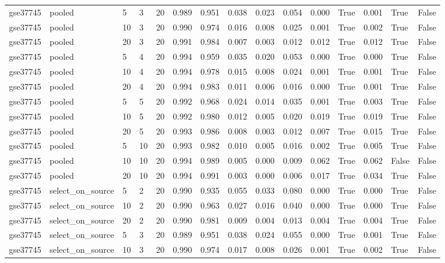 \begin{table}[t]
\begin{tabular}{lllllllllllllll}
    gse37745 & pooled & 5 & 3 & 20 & 0.989 & 0.951 & 0.038 & 0.023 & 0.054 & 0.000 & True & 0.001 & True & False \\
    gse37745 & pooled & 10 & 3 & 20 & 0.990 & 0.974 & 0.016 & 0.008 & 0.025 & 0.001 & True & 0.002 & True & False \\
    gse37745 & pooled & 20 & 3 & 20 & 0.991 & 0.984 & 0.007 & 0.003 & 0.012 & 0.012 & True & 0.012 & True & False \\
    gse37745 & pooled & 5 & 4 & 20 & 0.994 & 0.959 & 0.035 & 0.020 & 0.053 & 0.000 & True & 0.000 & True & False \\
    gse37745 & pooled & 10 & 4 & 20 & 0.994 & 0.978 & 0.015 & 0.008 & 0.024 & 0.001 & True & 0.001 & True & False \\
    gse37745 & pooled & 20 & 4 & 20 & 0.994 & 0.983 & 0.011 & 0.006 & 0.016 & 0.000 & True & 0.001 & True & False \\
    gse37745 & pooled & 5 & 5 & 20 & 0.992 & 0.968 & 0.024 & 0.014 & 0.035 & 0.001 & True & 0.003 & True & False \\
    gse37745 & pooled & 10 & 5 & 20 & 0.992 & 0.980 & 0.012 & 0.005 & 0.020 & 0.019 & True & 0.019 & True & False \\
    gse37745 & pooled & 20 & 5 & 20 & 0.993 & 0.986 & 0.008 & 0.003 & 0.012 & 0.007 & True & 0.015 & True & False \\
    gse37745 & pooled & 5 & 10 & 20 & 0.993 & 0.982 & 0.010 & 0.005 & 0.016 & 0.002 & True & 0.005 & True & False \\
    gse37745 & pooled & 10 & 10 & 20 & 0.994 & 0.989 & 0.005 & 0.000 & 0.009 & 0.062 & True & 0.062 & False & False \\
    gse37745 & pooled & 20 & 10 & 20 & 0.994 & 0.991 & 0.003 & 0.000 & 0.006 & 0.017 & True & 0.034 & True & False \\
    gse37745 & select\_on\_source & 5 & 2 & 20 & 0.990 & 0.935 & 0.055 & 0.033 & 0.080 & 0.000 & True & 0.000 & True & False \\
    gse37745 & select\_on\_source & 10 & 2 & 20 & 0.990 & 0.963 & 0.027 & 0.016 & 0.040 & 0.000 & True & 0.000 & True & False \\
    gse37745 & select\_on\_source & 20 & 2 & 20 & 0.990 & 0.981 & 0.009 & 0.004 & 0.013 & 0.004 & True & 0.004 & True & False \\
    gse37745 & select\_on\_source & 5 & 3 & 20 & 0.989 & 0.951 & 0.038 & 0.024 & 0.055 & 0.000 & True & 0.001 & True & False \\
    gse37745 & select\_on\_source & 10 & 3 & 20 & 0.990 & 0.974 & 0.017 & 0.008 & 0.026 & 0.001 & True & 0.002 & True & False \\

\end{tabular}
\end{table}

